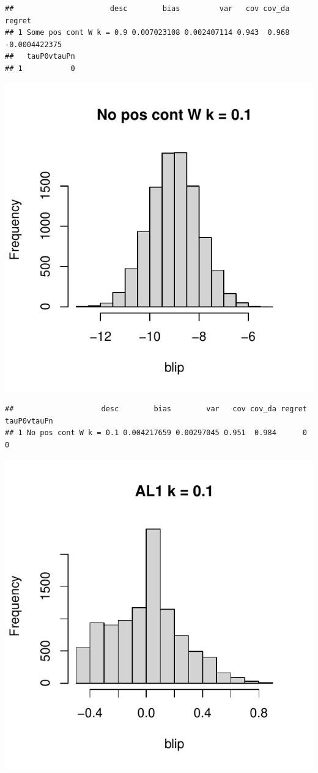 \documentclass[11pt]{article}\usepackage[]{graphicx}\usepackage[table]{xcolor}
\makeatletter
\def\maxwidth{ %
  \ifdim\Gin@nat@width>\linewidth
    \linewidth
  \else
    \Gin@nat@width
  \fi
}
\newenvironment{kframe}{%
 \def\at@end@of@kframe{}%
 \ifinner\ifhmode%
  \def\at@end@of@kframe{\end{minipage}}%
  \begin{minipage}{\columnwidth}%
 \fi\fi%
 \def\FrameCommand##1{\hskip\@totalleftmargin \hskip-\fboxsep
 \colorbox{shadecolor}{##1}\hskip-\fboxsep
     \hskip-\linewidth \hskip-\@totalleftmargin \hskip\columnwidth}%
 \MakeFramed {\advance\hsize-\width
   \@totalleftmargin\z@ \linewidth\hsize
   \@setminipage}}%
 {\par\unskip\endMakeFramed%
 \at@end@of@kframe}
\newenvironment{knitrout}{}{} %
\makeatother
\begin{document}
\begin{knitrout}
\begin{kframe}\begin{verbatim}
##                      desc        bias         var   cov cov_da        regret
## 1 Some pos cont W k = 0.9 0.007023108 0.002407114 0.943  0.968 -0.0004422375
##   tauP0vtauPn
## 1           0
\end{verbatim}
\end{kframe}
\includegraphics[width=\maxwidth]{figure/unnamed-chunk-4-10} 
\begin{kframe}\begin{verbatim}
##                    desc        bias        var   cov cov_da regret tauP0vtauPn
## 1 No pos cont W k = 0.1 0.004217659 0.00297045 0.951  0.984      0           0
\end{verbatim}
\end{kframe}
\includegraphics[width=\maxwidth]{figure/unnamed-chunk-4-11} 

\end{knitrout}
\end{document}
